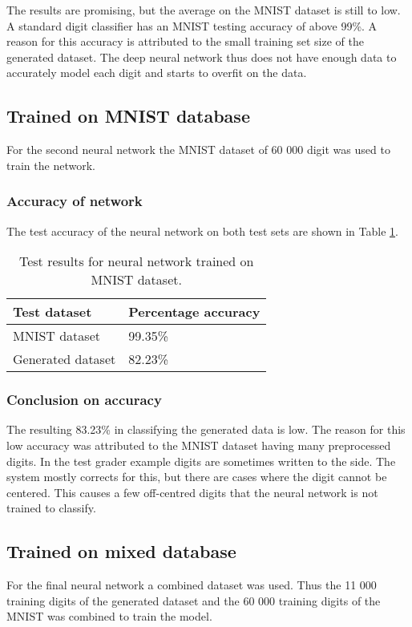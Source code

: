 The results are promising, but the average on the MNIST dataset is still to low. A standard digit classifier has an MNIST testing accuracy of above 99\%. A reason for this accuracy is attributed to the small training set size of the generated dataset. The deep neural network thus does not have enough data to accurately model each digit and starts to overfit on the data.

\subsection{Trained on MNIST database}
For the second neural network the MNIST dataset of 60 000 digit was used to train the network.

\subsubsection{Accuracy of network}
The test accuracy of the neural network on both test sets are shown in Table \ref{tbl:nnResult2}.

\begin{table}
\caption{Test results for neural network trained on MNIST dataset.} \label{tbl:nnResult2}
  \centering
\begin{tabular}{|p{4cm}|p{5cm}|}
\hline
\textbf{Test dataset}&\textbf{Percentage accuracy}\\
\hline
MNIST dataset&99.35\%\\
\hline
Generated dataset&82.23\%\\
\hline
\end{tabular}
\end{table}

\subsubsection{Conclusion on accuracy}

The resulting 83.23\% in classifying the generated data is low. The reason for this low accuracy was attributed to the MNIST dataset having many preprocessed digits. In the test grader example digits are sometimes written to the side. The system mostly corrects for this, but there are cases where the digit cannot be centered. This causes a few off-centred digits that the neural network is not trained to classify.

\subsection{Trained on mixed database}
For the final neural network a combined dataset was used. Thus the 11 000 training digits of the generated dataset and the 60 000 training digits of the MNIST was combined to train the model.

